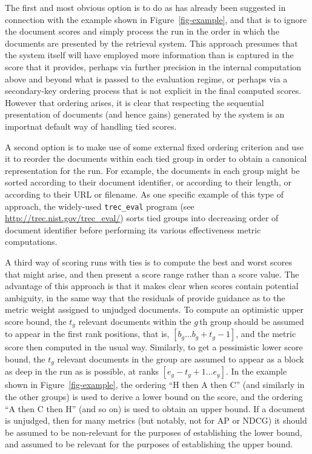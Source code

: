
The first and most obvious option is to do as has already been
suggested in connection with the example shown in
Figure~\ref{fig-example}, and that is to ignore the document scores
and simply process the run in the order in which the documents are
presented by the retrieval system.
This approach presumes that the system itself will have employed more
information than is captured in the score that it provides, perhaps
via further precision in the internal computation above and beyond
what is passed to the evaluation regime, or perhaps via a
secondary-key ordering process that is not explicit in the final
computed scores.
However that ordering arises, it is clear that respecting the
sequential presentation of documents (and hence gains) generated by
the system is an importnat default way of handling tied scores.


A second option is to make use of some external fixed ordering
criterion and use it to reorder the documents within each tied group
in order to obtain a canonical representation for the run.
For example, the documents in each group might be sorted according to
their document identifier, or according to their length, or according
to their URL or filename.
As one specific example of this type of approach, the widely-used
{\tt{trec\_eval}} program (see
{\small\url{http://trec.nist.gov/trec_eval/}}) sorts tied groups into
decreasing order of document identifier before performing its various
effectiveness metric computations.


A third way of scoring runs with ties is to compute the best and
worst scores that might arise, and then present a score range rather
than a score value.
The advantage of this approach is that it makes clear when scores
contain potential ambiguity, in the same way that the residuals of
{\citet{mz08acmtois}} provide guidance as to the metric weight
assigned to unjudged documents.
To compute an optimistic upper score bound, the $t_g$ relevant
documents within the $g$\,th group should be assumed to appear in the
first rank positions, that is, $[b_g\ldots b_g+t_g-1]$, and the
metric score then computed in the usual way.
Similarly, to get a pessimistic lower score bound, the $t_g$ relevant
documents in the group are assumed to appear as a block as deep in
the run as is possible, at ranks $[e_g-t_g+1\ldots e_g]$.
In the example shown in Figure~\ref{fig-example}, the ordering ``H
then A then C'' (and similarly in the other groups) is used to derive
a lower bound on the score, and the ordering ``A then C then H'' (and
so on) is used to obtain an upper bound.
If a document is unjudged, then for many metrics (but notably, not
for AP or NDCG) it should be assumed to be non-relevant for the
purposes of establishing the lower bound, and assumed to be relevant
for the purposes of establishing the upper bound.


